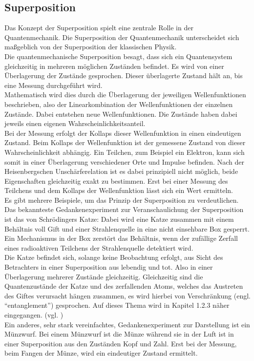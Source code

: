 \subsection{Superposition }
\label{sec: Superposition}

Das Konzept der Superposition spielt eine zentrale Rolle in der Quantenmechanik. Die Superposition der Quantenmechanik unterscheidet sich maßgeblich von der Superposition der klassischen Physik.\\
Die quantenmechanische Superposition besagt, dass sich ein Quantensystem gleichzeitig in mehreren möglichen Zuständen befindet. Es wird von einer Überlagerung der Zustände gesprochen. Dieser überlagerte Zustand hält an, bis eine Messung durchgeführt wird.\\
Mathematisch wird dies durch die Überlagerung der jeweiligen Wellenfunktionen beschrieben, also der Linearkombination der Wellenfunktionen der einzelnen Zustände. Dabei entstehen neue Wellenfunktionen. Die Zustände haben dabei jeweils einen eigenen Wahrscheinlichkeitsanteil.\\
Bei der Messung erfolgt der Kollaps dieser Wellenfunktion in einen eindeutigen Zustand. Beim Kollaps der Wellenfunktion ist der gemessene Zustand von dieser Wahrscheinlichkeit abhängig. Ein Teilchen, zum Beispiel ein Elektron, kann sich somit in einer Überlagerung verschiedener Orte und Impulse befinden. Nach der Heisenbergschen Unschärferelation ist es dabei prinzipiell nicht möglich, beide Eigenschaften gleichzeitig exakt zu bestimmen. Erst bei einer Messung des Teilchens und dem Kollaps der Wellenfunktion lässt sich ein Wert ermitteln.\\

Es gibt mehrere Beispiele, um das Prinzip der Superposition zu verdeutlichen. Das bekannteste Gedankenexperiment zur Veranschaulichung der Superposition ist das von Schrödingers Katze: Dabei wird eine Katze zusammen mit einem Behältnis voll Gift und einer Strahlenquelle in eine nicht einsehbare Box gesperrt. Ein Mechanismus in der Box zerstört das Behältnis, wenn der zufällige Zerfall eines radioaktiven Teilchens der Strahlenquelle detektiert wird.\\
Die Katze befindet sich, solange keine Beobachtung erfolgt, aus Sicht des Betrachters in einer Superposition aus lebendig und tot. Also in einer Überlagerung mehrerer Zustände gleichzeitig. Gleichzeitig sind die Quantenzustände der Katze und des zerfallenden Atoms, welches das Austreten des Giftes verursacht hängen zusammen, es wird hierbei von Verschränkung (engl. ``entanglement'') gesprochen. Auf dieses Thema wird in Kapitel 1.2.3 näher eingegangen. (vgl. \cite[Ch. 2.1.3]{homeister_quantum_2022-1})\\
Ein anderes, sehr stark vereinfachtes, Gedankenexperiment zur Darstellung ist ein Münzwurf. Bei einem Münzwurf ist die Münze während sie in der Luft ist in einer Superposition aus den Zuständen Kopf und Zahl. Erst bei der Messung, beim Fangen der Münze, wird ein eindeutiger Zustand ermittelt.\\

